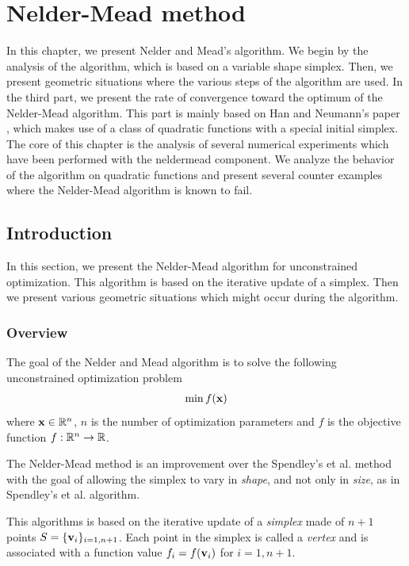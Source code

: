 \chapter{Nelder-Mead method}

In this chapter, we present Nelder and Mead's \cite{citeulike:3009487} algorithm.
We begin by the analysis of the algorithm, which is based on a variable shape simplex.
Then, we present geometric situations where the various steps of the algorithm 
are used. In the third part, we present the rate of convergence toward the optimum of 
the Nelder-Mead algorithm. This part is mainly based on Han and Neumann's paper \cite{HanNeumann2006}, 
which makes use of a class of quadratic functions with a special initial 
simplex. The core of this chapter is the analysis of several numerical 
experiments which have been performed with the neldermead component.
We analyze the behavior of the algorithm on quadratic functions and 
present several counter examples where the Nelder-Mead algorithm is 
known to fail.

\section{Introduction}

In this section, we present the Nelder-Mead algorithm for unconstrained optimization.
This algorithm is based on the iterative update of a simplex. 
Then we present various geometric situations which might occur
during the algorithm. 

\subsection{Overview}

The goal of the Nelder and Mead algorithm is to solve the 
following unconstrained optimization problem
\begin{eqnarray}
\min f(\mathbf{x})
\end{eqnarray}
where $\mathbf{x}\in \mathbb{R}^n$, $n$ is the number of optimization parameters and $f$ is the objective 
function $f:\mathbb{R}^n\rightarrow \mathbb{R}$.

The Nelder-Mead method is an improvement over the Spendley's et al.
method with the goal of allowing the simplex to vary in \emph{shape}, 
and not only in \emph{size}, as in Spendley's et al. algorithm.

This algorithms is based on the iterative update of 
a \emph{simplex} made of $n+1$ points $S=\{\mathbf{v}_i\}_{i=1,n+1}$. Each point 
in the simplex is called a \emph{vertex} and is associated with 
a function value $f_i=f(\mathbf{v}_i)$ for $i=1,n+1$.

